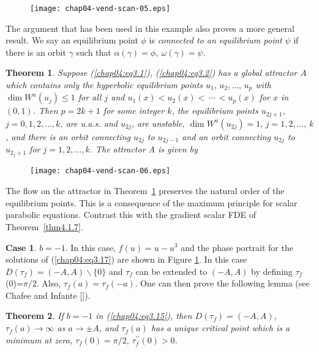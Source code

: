 \documentclass{surv-l}
\theoremstyle{plain}
\newtheorem{theorem}{Theorem}[section]
\theoremstyle{definition}
\newtheorem{case}{Case}
\numberwithin{equation}{section}
\numberwithin{figure}{chapter}
\begin{document}
\begin{figure}
\texttt{[image: chap04-vend-scan-05.eps]}
\caption{}\label{fig3.4}
\end{figure}

The argument that has been used in this example also proves a more general result. We say an equilibrium point $\phi$ is \emph{connected to an equilibrium point} $\psi$ if there is an orbit $\gamma$ such that $\alpha(\gamma)=\phi,\ \omega(\gamma)=\psi$.


\begin{theorem}\label{thm4.3.10} Suppose \emph{(\ref{chap04:eq3.1}), (\ref{chap04:eq3.2})} has a global attractor $A$ which contains only the hyperbolic equilibrium points $u_{1},\,u_{2},\ldots,\,u_{p}$ with $\dim W^{u}(u_{j})\leq 1$ for all $j$ and $u_{1}(x)<u_{2}(x)<\,\cdots\,< u_{p}(x)$ for $x$ in $(0,1)$. Then $p = 2k+1$ for some integer $k$, the equilibrium points $u_{2j+1}$, $j=0,1,2,\ldots,k$, are u.a.s. and $u_{2j}$, are unstable, $\dim W^{u}(u_{2j})=1,\,j=1,2,\ldots,\,k$, and there is an orbit connecting $u_{2j}$ to $u_{2j-1}$ and an orbit connecting $u_{2j}$ to $u_{2_{j}+1}$ for $j=1,2,\ldots,k$. The attractor $A$ is given by
\end{theorem}
\begin{figure}[!h]
\texttt{[image: chap04-vend-scan-06.eps]}
\end{figure}

The flow on the attractor in Theorem~\ref{thm4.3.10} preserves the natural order of the equilibrium points. This is a consequence of the maximum principle for scalar parabolic equations. Contrast this with the gradient scalar FDE of Theorem~\ref{thm4.1.7}.

\begin{case}\label{case2} $b=-1$. In this case, $f(u)=u-u^{3}$ and the phase portrait for the solutions of (\ref{chap04:eq3.17}) are shown in Figure \ref{fig3.4}. In this case $D(\tau_{f})=(-A, A)\backslash\{0\}$ and $\tau_{f}$ can be extended to $(-A, A)$ by defining $\tau_{f}$(0)=$\pi/2$. Also, $\tau_{f}(a)=\tau_{f}(-a)$. One can then prove the following lemma (see Chafee and Infante [\citeyear{1974ci}]).
\end{case}
\begin{theorem}\label{thm4.3.11} If $b=-1$ in \emph{(\ref{chap04:eq3.15})}, then $D(\tau_{f})=(-A, A)$, $\tau_{f}(a)\rightarrow\infty$ as $a\rightarrow \pm A$, and $\tau_{f}(a)$ has a unique critical point which is a minimum at zero, $\tau_{f}(0)=\pi/2,\,\tau_{f}^{\prime\prime}(0)>0$.
\end{theorem}
\end{document}
